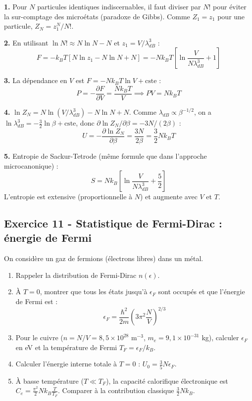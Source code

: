 \documentclass[12pt,a4paper]{article}
\begin{document}
\begin{boitecorrige}
\textbf{1.} Pour $N$ particules identiques indiscernables, il faut diviser par $N!$ pour éviter la sur-comptage des microétats (paradoxe de Gibbs). Comme $Z_1 = z_1$ pour une particule, $Z_N = z_1^N/N!$.

\textbf{2.} En utilisant $\ln N!\approx N\ln N - N$ et $z_1 = V/\lambda_{dB}^3$ :
\[
F = -k_BT\left[N\ln z_1 - N\ln N + N\right] = -Nk_BT\left[\ln\frac{V}{N\lambda_{dB}^3} + 1\right]
\]

\textbf{3.} La dépendance en $V$ est $F = -Nk_BT\ln V + \text{cste}$ :
\[
P = -\frac{\partial F}{\partial V} = \frac{Nk_BT}{V} \implies \boxed{PV = Nk_BT}
\]

\textbf{4.} $\ln Z_N = N\ln(V/\lambda_{dB}^3) - N\ln N + N$. Comme $\lambda_{dB}\propto\beta^{-1/2}$, on a $\ln\lambda_{dB}^3 = -\frac{3}{2}\ln\beta + \text{cste}$, donc $\partial\ln Z_N/\partial\beta = -3N/(2\beta)$ :
\[
U = -\frac{\partial\ln Z_N}{\partial\beta} = \frac{3N}{2\beta} = \frac{3}{2}Nk_BT
\]

\textbf{5.} Entropie de Sackur-Tetrode (même formule que dans l'approche microcanonique) :
\[
S = Nk_B\left[\ln\frac{V}{N\lambda_{dB}^3} + \frac{5}{2}\right]
\]
L'entropie est extensive (proportionnelle à $N$) et augmente avec $V$ et $T$.
\end{boitecorrige}

\subsection*{Exercice 11 - Statistique de Fermi-Dirac : énergie de Fermi \niveau{\difficile}}

\begin{boiteexercice}
On considère un gaz de fermions (électrons libres) dans un métal.
\begin{enumerate}
  \item Rappeler la distribution de Fermi-Dirac $n(\epsilon)$.
  \item À $T=0$, montrer que tous les états jusqu'à $\epsilon_F$ sont occupés et que l'énergie de Fermi est :
  \[
  \epsilon_F = \frac{\hbar^2}{2m}\left(3\pi^2\frac{N}{V}\right)^{2/3}
  \]
  \item Pour le cuivre ($n = N/V = 8{,}5\times10^{28}$ m$^{-3}$, $m_e = 9{,}1\times10^{-31}$ kg), calculer $\epsilon_F$ en eV et la température de Fermi $T_F = \epsilon_F/k_B$.
  \item Calculer l'énergie interne totale à $T=0$ : $U_0 = \frac{3}{5}N\epsilon_F$.
  \item À basse température ($T\ll T_F$), la capacité calorifique électronique est $C_e = \frac{\pi^2}{2}Nk_B\frac{T}{T_F}$. Comparer à la contribution classique $\frac{3}{2}Nk_B$.
\end{enumerate}
\end{boiteexercice}
\end{document}

